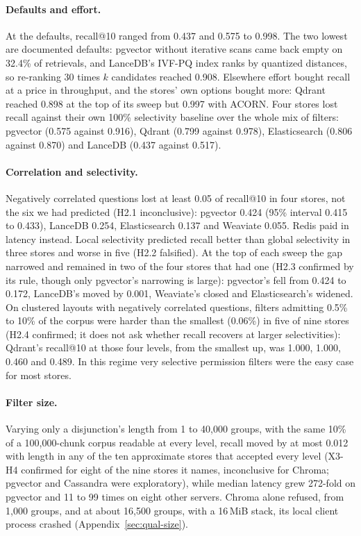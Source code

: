 \paragraph{Defaults and effort.}
At the defaults, recall@10 ranged from 0.437 and 0.575 to 0.998. The two lowest are documented defaults: pgvector without iterative scans came back
empty on 32.4\% of retrievals, and LanceDB's IVF-PQ index ranks by quantized distances, so re-ranking 30 times $k$ candidates reached 0.908. Elsewhere effort bought
recall at a price in throughput, and the stores' own options bought more: Qdrant reached 0.898 at the top of its sweep but 0.997 with ACORN. Four stores
lost recall against their own 100\% selectivity baseline over the whole mix of filters: pgvector (0.575 against 0.916), Qdrant (0.799 against 0.978), Elasticsearch (0.806 against
0.870) and LanceDB (0.437 against 0.517).

\paragraph{Correlation and selectivity.}
Negatively correlated questions lost at least 0.05 of recall@10 in four stores, not the six we had predicted (H2.1 inconclusive): pgvector 0.424 (95\% interval
0.415 to 0.433), LanceDB 0.254, Elasticsearch 0.137 and Weaviate 0.055. Redis paid in latency instead. Local selectivity predicted recall better
than global selectivity in three stores and worse in five (H2.2 falsified). At the top of each sweep the gap narrowed and remained in two of the four stores that had one (H2.3
confirmed by its rule, though only pgvector's narrowing is large): pgvector's fell from 0.424 to 0.172, LanceDB's moved by 0.001, Weaviate's closed and Elasticsearch's widened. On clustered layouts with negatively
correlated questions, filters admitting 0.5\% to 10\% of the corpus were harder than the smallest (0.06\%) in five of nine stores (H2.4 confirmed; it does not ask whether recall recovers at larger selectivities): Qdrant's
recall@10 at those four levels, from the smallest up, was 1.000, 1.000, 0.460 and 0.489. In this regime very selective permission filters were the easy case for most
stores.

\paragraph{Filter size.}
Varying only a disjunction's length from 1 to 40,000 groups, with the same 10\% of a 100,000-chunk corpus readable at every level, recall moved by at most 0.012 with length in
any of the ten approximate stores that accepted every level (X3-H4 confirmed for eight of the nine stores it names, inconclusive for Chroma; pgvector and Cassandra were exploratory), while median latency grew 272-fold on pgvector and 11 to 99 times on eight other
servers. Chroma alone refused, from 1,000 groups, and at about 16,500 groups, with a 16\,MiB stack, its local client process crashed (Appendix~\ref{sec:qual-size}).
